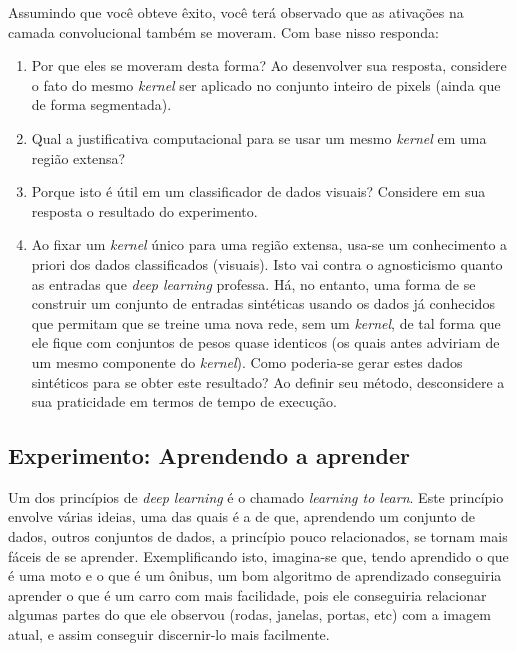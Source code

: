 \documentclass[12pt, a4paper]{article}
\begin{document}
Assumindo que você obteve êxito, você terá observado que as ativações na camada convolucional também se moveram. Com base nisso responda:
\begin{enumerate}
\item Por que eles se moveram desta forma? Ao desenvolver sua resposta, considere o fato do mesmo \emph{kernel} ser aplicado no conjunto inteiro de pixels (ainda que de forma segmentada). 
\item Qual a justificativa computacional para se usar um mesmo \emph{kernel} em uma região extensa?
\item Porque isto é útil em um classificador de dados visuais? Considere em sua resposta o resultado do experimento.
\item Ao fixar um \emph{kernel} único para uma região extensa, usa-se um conhecimento a priori dos dados classificados (visuais). Isto vai contra o agnosticismo quanto as entradas que \emph{deep learning} professa. Há, no entanto, uma forma de se construir um conjunto de entradas sintéticas usando os dados já conhecidos que permitam que se treine uma nova rede, sem um \emph{kernel}, de tal forma que ele fique com conjuntos de pesos quase identicos (os quais antes adviriam de um mesmo componente do \emph{kernel}). Como poderia-se gerar estes dados sintéticos para se obter este resultado? Ao definir seu método, desconsidere a sua praticidade em termos de tempo de execução. 
\end{enumerate} 

\subsection{Experimento: Aprendendo a aprender}

Um dos princípios de \emph{deep learning} é o chamado \emph{learning to learn}. Este princípio envolve várias ideias, uma das quais é a de que, aprendendo um conjunto de dados, outros conjuntos de dados, a princípio pouco relacionados, se tornam mais fáceis de se aprender. Exemplificando isto, imagina-se que, tendo aprendido o que é uma moto e o que é um ônibus, um bom algoritmo de aprendizado conseguiria aprender o que é um carro com mais facilidade, pois ele conseguiria relacionar algumas partes do que ele observou (rodas, janelas, portas, etc) com a imagem atual, e assim conseguir discernir-lo mais facilmente. 
\end{document}
